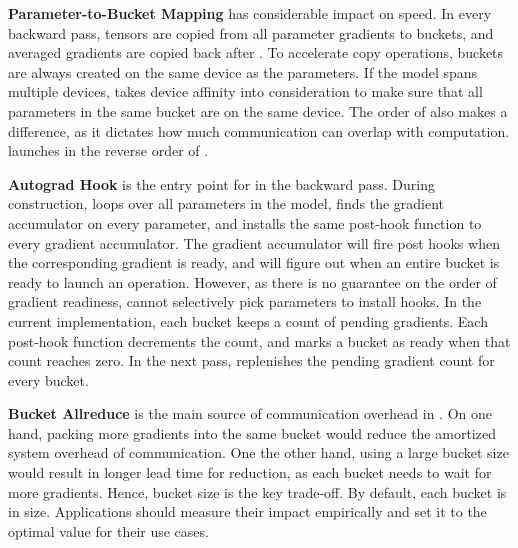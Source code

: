 \textbf{Parameter-to-Bucket Mapping} has considerable impact on  speed. In every backward pass, tensors are copied from all parameter gradients to buckets, and averaged gradients are copied back after . To accelerate copy operations, buckets are always created on the same device as the parameters. If the model spans multiple devices,  takes device affinity into consideration to make sure that all parameters in the same bucket are on the same device. The order of  also makes a difference, as it dictates how much communication can overlap with computation.  launches  in the reverse order of .

\textbf{Autograd Hook} is the entry point for  in the backward pass. During construction,  loops over all parameters in the model, finds the gradient accumulator on every parameter, and installs the same post-hook function to every gradient accumulator. The gradient accumulator will fire post hooks when the corresponding gradient is ready, and  will figure out when an entire bucket is ready  to launch an  operation. However, as there is no guarantee on the order of gradient readiness,  cannot selectively pick parameters to install hooks. In the current implementation, each bucket keeps a count of pending gradients. Each post-hook function decrements the count, and  marks a bucket as ready when that count reaches zero. In the next  pass,  replenishes the pending gradient count for every bucket.

\textbf{Bucket Allreduce} is the main source of communication overhead in . On one hand, packing more gradients into the same bucket would reduce the amortized system overhead of communication. One the other hand, using a large bucket size would result in longer lead time for reduction, as each bucket needs to wait for more gradients. Hence, bucket size is the key trade-off. By default, each bucket is  in size. Applications should measure their impact empirically and set it to the optimal value for their use cases.

